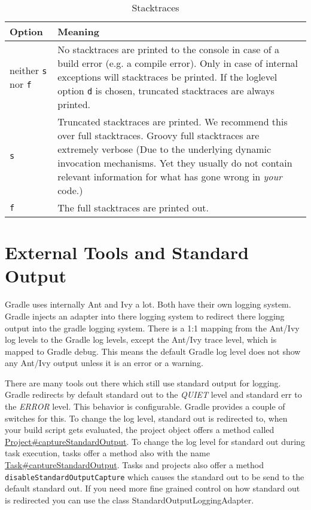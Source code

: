 \begin{table}
	\begin{center}
    \begin{tabular}{|l|p{15cm}|} \hline
    Option & Meaning  \\ \hline
    neither \texttt{s} nor \texttt{f} & No stacktraces are printed to the console in case of a build error (e.g. a compile error). Only in case of internal exceptions will stacktraces be printed. If the loglevel option \texttt{d} is chosen, truncated stacktraces are always printed. \\ \hline
    \texttt{s} & Truncated stacktraces are printed. We recommend this over full stacktraces. Groovy full stacktraces are extremely verbose (Due to the underlying dynamic invocation mechanisms. Yet they usually do not contain relevant information for what has gone wrong in \emph{your} code.)  \\ \hline
    \texttt{f} & The full stacktraces are printed out. \\ \hline
    \end{tabular}
	\end{center}
	\caption{Stacktraces}
	\label{stacktraces}
\end{table}

\section{External Tools and Standard Output} %
\label{sec:external_tools}
Gradle uses internally Ant and Ivy a lot. Both have their own logging system. Gradle injects an adapter into there logging system to redirect there logging output into the gradle logging system. There is a 1:1 mapping from the Ant/Ivy log levels to the Gradle log levels, except the Ant/Ivy trace level, which is mapped to Gradle debug. This means the default Gradle log level does not show any Ant/Ivy output unless it is an error or a warning. 

There are many tools out there which still use standard output for logging. Gradle redirects by default standard out to the \emph{QUIET} level and standard err to the \emph{ERROR} level. This behavior is configurable. Gradle provides a couple of switches for this. To change the log level, standard out is redirected to, when your build script gets evaluated, the project object offers a method called \href{\API Project.html}{Project\#captureStandardOutput}. To change the log level for standard out during task execution, tasks offer a method also with the name \href{\API Task.html}{Task\#captureStandardOutput}. Tasks and projects also offer a method \texttt{disableStandardOutputCapture} which causes the standard out to be send to the default standard out. If you need more fine grained control on how standard out is redirected you can use the class StandardOutputLoggingAdapter.


